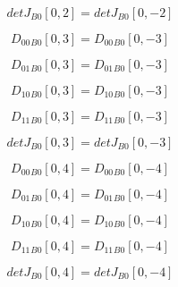 \documentclass{article}
\begin{document}
\begin{dmath}{detJ{_{B0}}}[{0,2}] = {detJ{_{B0}}}[{0,-2}]\end{dmath}

\begin{dmath}{D_{00}{_{B0}}}[{0,3}] = {D_{00}{_{B0}}}[{0,-3}]\end{dmath}

\begin{dmath}{D_{01}{_{B0}}}[{0,3}] = {D_{01}{_{B0}}}[{0,-3}]\end{dmath}

\begin{dmath}{D_{10}{_{B0}}}[{0,3}] = {D_{10}{_{B0}}}[{0,-3}]\end{dmath}

\begin{dmath}{D_{11}{_{B0}}}[{0,3}] = {D_{11}{_{B0}}}[{0,-3}]\end{dmath}

\begin{dmath}{detJ{_{B0}}}[{0,3}] = {detJ{_{B0}}}[{0,-3}]\end{dmath}

\begin{dmath}{D_{00}{_{B0}}}[{0,4}] = {D_{00}{_{B0}}}[{0,-4}]\end{dmath}

\begin{dmath}{D_{01}{_{B0}}}[{0,4}] = {D_{01}{_{B0}}}[{0,-4}]\end{dmath}

\begin{dmath}{D_{10}{_{B0}}}[{0,4}] = {D_{10}{_{B0}}}[{0,-4}]\end{dmath}

\begin{dmath}{D_{11}{_{B0}}}[{0,4}] = {D_{11}{_{B0}}}[{0,-4}]\end{dmath}

\begin{dmath}{detJ{_{B0}}}[{0,4}] = {detJ{_{B0}}}[{0,-4}]\end{dmath}
\end{document}
